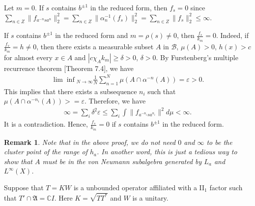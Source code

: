 \documentclass[a4paper,10pt]{amsart}
\newtheorem{remark}{Remark}[section]
\newcommand{\AAA}{\mathfrak A}
\newcommand{\C}{\mathbb C} %
\begin{document}
Let $m = 0$.
If $s$ contains $b^{\pm 1}$ in the reduced form, then
$f_{s} = 0$ since $\sum_{n \in Z} \| f_{a^{-n}sa^{n}} \|_{2}^{2} 
= \sum_{n \in Z} \|\alpha_{n}^{-1}(f_{s}) \|_{2}^{2}
    = \sum_{n \in Z} \| f_{s} \|_{2}^{2} \leq \infty$.

If $s$ contains $b^{\pm 1}$ in the reduced form and $m = \rho(s) \neq 0$, then
$\frac{f_s}{k_m} = 0$. Indeed, if $\frac{f_s}{k_m} = h \neq 0$, then 
there exists a measurable subset 
$A$ in $\mathcal{B}$, $\mu(A) > 0$, $h(x) > c$ for almost 
every $x \in A$ and 
$ |c\chi_{A}k_{m}| \geq \delta > 0$, $\delta > 0$. 
By Furstenberg's multiple recurrence theorem \cite{MT}[Theorem 7.4], we have
\begin{align*}
{\lim \inf}_{N \rightarrow \infty} \frac{1}{N} \sum^{N}_{n = 1} \mu(A \cap
\alpha^{-n}(A)) = \varepsilon > 0.
\end{align*}
This implies that there exists a subsequence $n_{i}$ such that $\mu(A \cap
\alpha^{-n_i}(A)) >= \varepsilon$. Therefore, we have
\begin{align}
\infty = \sum_{i}\delta^{2}\varepsilon \leq
\sum_{i} \int \|f_{a^{-n_{i}}sa^{n_{i}}}\|^{2} d\mu < \infty .
\end{align}
It is a contradiction. Hence, $\frac{f_s}{k_m} = 0$ if 
$s$ contains $b^{\pm 1}$ in the reduced form. 

\begin{remark}
Note that in the above proof, we do not need $0$ and $\infty$ to be the
cluster point of the range of $h_a$. In another word, this is just a 
tedious way to show that $A$ must be in the von Neumann subalgebra generated
by $L_a$ and $L^{\infty}(X)$. 
\end{remark}

Suppose that $T = KW$ is a unbounded operator affiliated with a II$_{1}$ 
factor such that $T' \cap \AAA = \C I$.
Here $K = \sqrt{TT^{*}}$ and $W$ is a unitary.
\end{document}
